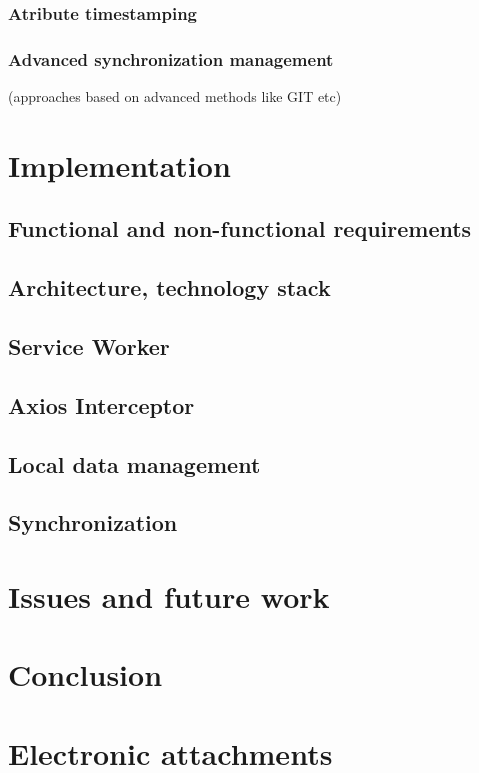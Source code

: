 \documentclass[
  digital,     %
  color,       %
  oneside,     %
  nosansbold,  %
  nocolorbold, %
  lof,         %
  lot,         %
]{fithesis4}
\begin{document}
\subsection{Atribute timestamping}
\subsection{Advanced synchronization management}
(approaches based on advanced methods like GIT etc)

\chapter{Implementation}
\section{Functional and non-functional requirements}
\section{Architecture, technology stack}
\section{Service Worker}
\section{Axios Interceptor}
\section{Local data management}
\section{Synchronization}

\chapter{Issues and future work}

\chapter*{Conclusion}

\setcounter{biburllcpenalty}{7000}
\setcounter{biburlucpenalty}{8000}
\printbibliography[heading=bibintoc] %

\appendix %
\chapter{Electronic attachments}
\end{document}
